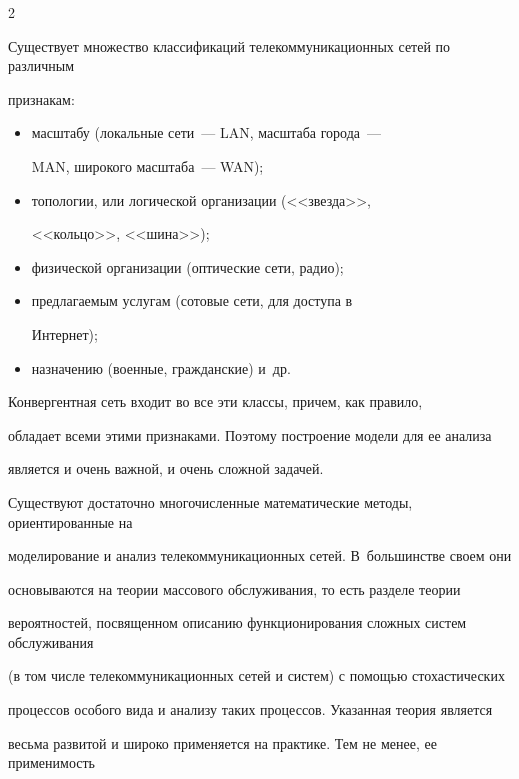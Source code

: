 \begin{multicols}{2}
%


Существует множество классификаций телекоммуникационных сетей по различным


признакам:


\begin{itemize}


\item масштабу (локальные сети~--- LAN, масштаба города~---


MAN, широкого масштаба~--- WAN);


\item топологии, или логической организации (<<звезда>>,


<<кольцо>>, <<шина>>);


\item физической организации (оптические сети, радио);


\item предлагаемым услугам (сотовые сети, для доступа в


Интернет);


\item назначению (военные, гражданские) и~др.


\end{itemize}








Конвергентная сеть входит во все эти классы, причем, как правило,


обладает всеми этими признаками. Поэтому построение модели для ее анализа


является и очень важной, и очень сложной задачей.





Существуют достаточно многочисленные математические методы, ориентированные на


моделирование и анализ телекоммуникационных сетей. В~большинстве своем они


основываются на теории массового обслуживания, то есть разделе теории


вероятностей, посвященном описанию функционирования сложных систем обслуживания


(в том чис\-ле телекоммуникационных сетей и систем) с помощью стохастических


процессов особого вида и анализу таких процессов. Указанная теория является


весьма развитой и широко применяется на практике. Тем не менее, ее применимость



\end{multicols}
